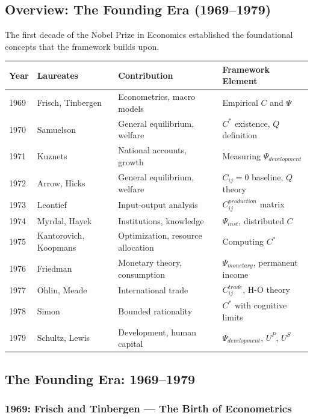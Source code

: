 \documentclass[12pt,a4paper]{article}
\begin{document}
\subsection{Overview: The Founding Era (1969--1979)}

The first decade of the Nobel Prize in Economics established the foundational
concepts that the framework builds upon.

\begin{center}
\renewcommand{\arraystretch}{1.15}
\small
\begin{tabular}{llll}
\hline
\textbf{Year} & \textbf{Laureates} & \textbf{Contribution} & \textbf{Framework Element} \\
\hline
1969 & Frisch, Tinbergen & Econometrics, macro models & Empirical $C$ and $\Psi$ \\
1970 & Samuelson & General equilibrium, welfare & $C^*$ existence, $Q$ definition \\
1971 & Kuznets & National accounts, growth & Measuring $\Psi_{development}$ \\
1972 & Arrow, Hicks & General equilibrium, welfare & $C_{ij} = 0$ baseline, $Q$ theory \\
1973 & Leontief & Input-output analysis & $C^{production}_{ij}$ matrix \\
1974 & Myrdal, Hayek & Institutions, knowledge & $\Psi_{inst}$, distributed $C$ \\
1975 & Kantorovich, Koopmans & Optimization, resource allocation & Computing $C^*$ \\
1976 & Friedman & Monetary theory, consumption & $\Psi_{monetary}$, permanent income \\
1977 & Ohlin, Meade & International trade & $C^{trade}_{ij}$, H-O theory \\
1978 & Simon & Bounded rationality & $C^*$ with cognitive limits \\
1979 & Schultz, Lewis & Development, human capital & $\Psi_{development}$, $U^P$, $U^S$ \\
\hline
\end{tabular}
\end{center}

\subsection{The Founding Era: 1969--1979}

\subsubsection{1969: Frisch and Tinbergen --- The Birth of Econometrics}
\end{document}
